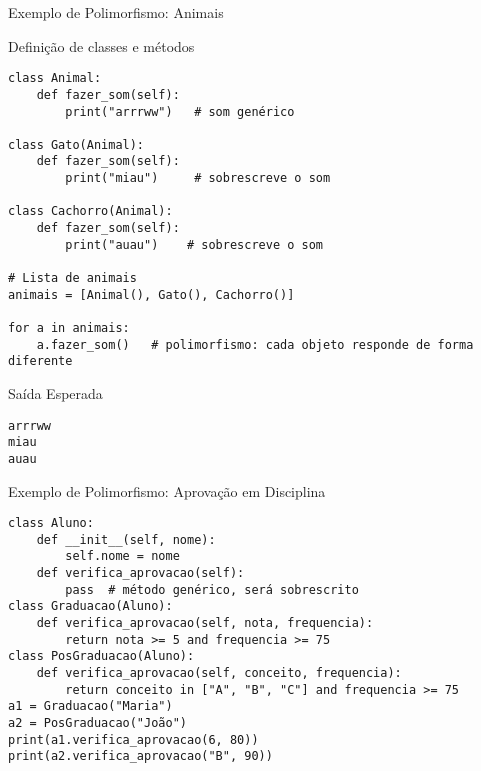 \begin{frame}[fragile]{Exemplo de Polimorfismo: Animais}

\begin{exampleblock}{Definição de classes e métodos}
\begin{verbatim}
class Animal:
    def fazer_som(self):
        print("arrrww")   # som genérico

class Gato(Animal):
    def fazer_som(self):
        print("miau")     # sobrescreve o som

class Cachorro(Animal):
    def fazer_som(self):
        print("auau")    # sobrescreve o som

# Lista de animais
animais = [Animal(), Gato(), Cachorro()]

for a in animais:
    a.fazer_som()   # polimorfismo: cada objeto responde de forma diferente
\end{verbatim}
\end{exampleblock}

\begin{block}{Saída Esperada}
\begin{verbatim}
arrrww
miau
auau
\end{verbatim}
\end{block}

\end{frame}


\begin{frame}[fragile]{Exemplo de Polimorfismo: Aprovação em Disciplina}


\begin{verbatim}
class Aluno:
    def __init__(self, nome):
        self.nome = nome
    def verifica_aprovacao(self):
        pass  # método genérico, será sobrescrito
class Graduacao(Aluno):
    def verifica_aprovacao(self, nota, frequencia):
        return nota >= 5 and frequencia >= 75
class PosGraduacao(Aluno):
    def verifica_aprovacao(self, conceito, frequencia):
        return conceito in ["A", "B", "C"] and frequencia >= 75
a1 = Graduacao("Maria")
a2 = PosGraduacao("João")
print(a1.verifica_aprovacao(6, 80))    
print(a2.verifica_aprovacao("B", 90))  
\end{verbatim}




\end{frame}

